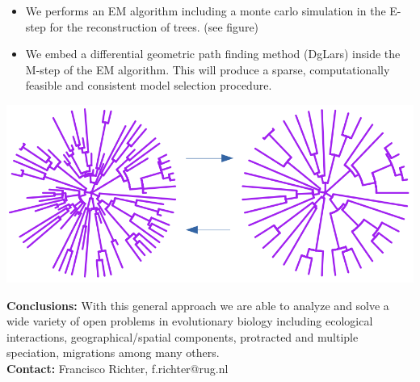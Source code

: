 \documentclass[a0paper,portrait]{baposter}
\begin{document}
\begin{poster}
{\vspace{-0.4cm}
\begin{itemize}
\item %
We performs an EM algorithm including a monte carlo simulation in the E-step for the reconstruction of trees. (see figure)
\vspace{-0.35cm}
\item We embed a differential geometric path finding method (DgLars) inside the M-step of the EM algorithm. This will produce a sparse, computationally feasible and consistent model selection procedure.  
\end{itemize}
\vspace{-0.7cm}
\begin{center}
                \includegraphics[width=0.6\linewidth]{figures/fco.png}
				\end{center}
\vspace{-0.45cm}
\textbf{Conclusions:} With this general approach we are able to analyze and solve a wide variety of open problems in evolutionary biology including ecological interactions, geographical/spatial components, protracted and multiple speciation, migrations among many others.\\  
\textbf{Contact: } Francisco Richter, f.richter@rug.nl
}


\end{poster}
\end{document}
